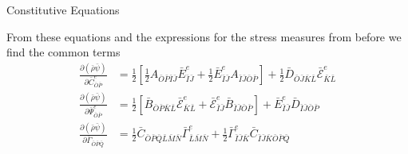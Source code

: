 \documentclass[11pt]{beamer}
\begin{document}
%
%

\begin{frame}{Constitutive Equations}

From these equations and the expressions for the stress measures from before we find the common terms
\begin{align*}
\frac{\partial \left(\bar{\rho} \bar{\psi}\right)}{\partial \bar{C}_{\bar{O}\bar{P}}^e} &= \frac{1}{2} \left[\frac{1}{2}A_{\bar{O}\bar{P} \bar{I}\bar{J}} \bar{E}_{\bar{I}\bar{J}}^e + \frac{1}{2}\bar{E}_{\bar{I}\bar{J}}^eA_{\bar{I}\bar{J}\bar{O}\bar{P}}\right]+ \frac{1}{2} \bar{D}_{\bar{O}\bar{J}\bar{K}\bar{L}}\bar{\mathcal{E}}_{\bar{K}\bar{L}}^e\\
\frac{\partial \left(\bar{\rho}\bar{\psi}\right)}{\partial \bar{\Psi}_{\bar{O}\bar{P}}^e} &= \frac{1}{2}\left[ \bar{B}_{\bar{O}\bar{P}\bar{K}\bar{L}} \bar{\mathcal{E}}_{\bar{K}\bar{L}}^e + \bar{\mathcal{E}}_{\bar{I}\bar{J}}^e \bar{B}_{\bar{I}\bar{J}\bar{O}\bar{P}} \right]+ \bar{E}_{\bar{I}\bar{J}}^e \bar{D}_{\bar{I}\bar{J}\bar{O}\bar{P}}\\
\frac{\partial \left(\bar{\rho}\bar{\psi}\right)}{\partial \bar{\Gamma}_{\bar{O}\bar{P}\bar{Q}}} &= \frac{1}{2}\bar{C}_{\bar{O}\bar{P}\bar{Q}\bar{L}\bar{M}\bar{N}} \bar{\Gamma}_{\bar{L}\bar{M}\bar{N}}^e + \frac{1}{2}\bar{\Gamma}_{\bar{I}\bar{J}\bar{K}}^e \bar{C}_{\bar{I}\bar{J}\bar{K}\bar{O}\bar{P}\bar{Q}}\\
\end{align*}

\end{frame}
\end{document}
